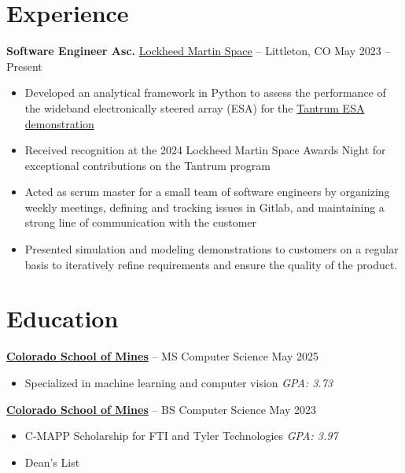 \documentclass[11pt]{article}       %
\begin{document}
\section*{Experience}
\textbf{Software Engineer Asc.} \href{https://www.lockheedmartin.com/en-us/capabilities/space.html}{Lockheed Martin Space}
-- Littleton, CO \hfill May 2023 -- Present \\
\vspace{-9pt}
\begin{itemize}
  \item Developed an analytical framework in Python to assess the performance of
        the wideband electronically steered array (ESA) for the
        \href{https://news.lockheedmartin.com/ESA_payload_demonstrator}{Tantrum ESA demonstration}
  \item Received recognition at the 2024 Lockheed Martin Space Awards Night for
        exceptional contributions on the Tantrum program
  \item Acted as scrum master for a small team of software engineers by
        organizing weekly meetings, defining and tracking issues in Gitlab, and
        maintaining a strong line of communication with the customer
  \item Presented simulation and modeling demonstrations to customers on a
        regular basis to iteratively refine requirements and ensure the quality
        of the product.
\end{itemize}

\vspace{-18.5pt}

\section*{Education}
\textbf{\href{https://cs.mines.edu}{Colorado School of Mines}} -- MS Computer Science \hfill May 2025 \\
\vspace{-11.5pt}
\begin{itemize}
  \itemsep -0.5em
  \item Specialized in machine learning and computer vision \hfill \textit{GPA: 3.73}
\end{itemize}

\vspace{-6.5pt}

\textbf{\href{https://cs.mines.edu}{Colorado School of Mines}} -- BS Computer Science \hfill May 2023 \\
\vspace{-11.5pt}
\begin{itemize}
  \itemsep -0.5em
  \item C-MAPP Scholarship for FTI and Tyler Technologies \hfill \textit{GPA: 3.97}
  \item Dean's List \hfill
\end{itemize}
\end{document}
